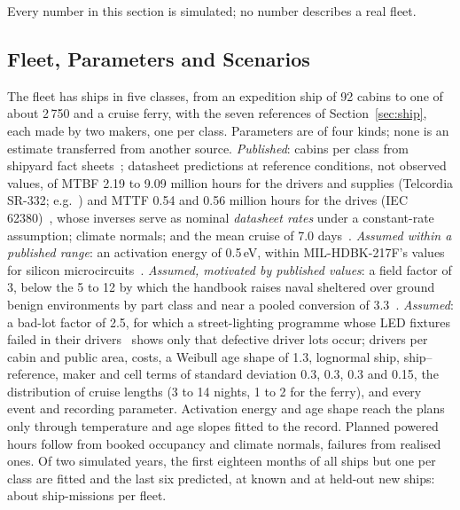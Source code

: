 Every number in this section is simulated; no number describes a real fleet.

\subsection{Fleet, Parameters and Scenarios}
The fleet has \flShips{} ships in five classes, from an expedition ship of 92
cabins to one of about 2\,750 and a cruise ferry, with the seven references of
Section~\ref{sec:ship}, each made by two makers, one per class. Parameters are
of four kinds; none is an estimate transferred from another source.
\emph{Published}: cabins per class from shipyard fact
sheets~\cite{fincantieri_laperouse,oasis_class}; datasheet predictions at
reference conditions, not observed values, of MTBF 2.19 to 9.09 million hours
for the drivers and supplies (Telcordia SR-332; e.g.~\cite{meanwell_lpv60}) and MTTF
0.54 and 0.56 million hours for the drives (IEC 62380)~\cite{schneider_atv212},
whose inverses serve as nominal \emph{datasheet rates} under a constant-rate
assumption; climate normals; and the mean cruise of 7.0
days~\cite{clia2025}. \emph{Assumed within a published range}: an activation
energy of 0.5\,eV, within MIL-HDBK-217F's values for silicon
microcircuits~\cite{milhdbk217f}. \emph{Assumed, motivated by published
values}: a field factor of 3, below the 5 to 12 by which the handbook raises
naval sheltered over ground benign environments by part class and near a pooled
conversion of 3.3~\cite{jeong2011}. \emph{Assumed}: a bad-lot factor
of 2.5, for which a street-lighting programme whose LED fixtures failed in
their drivers~\cite{halifax2019} shows only that defective driver lots occur;
drivers per cabin
and public area, costs, a Weibull age shape of 1.3, lognormal ship,
ship--reference, maker and cell terms of standard deviation 0.3, 0.3, 0.3 and
0.15, the distribution of cruise lengths (3 to 14 nights, 1 to 2 for the
ferry), and every event and recording parameter. Activation energy and age
shape reach the plans only through temperature and age slopes fitted to the
record. Planned powered hours follow from booked occupancy and climate
normals, failures from realised ones. Of two simulated years, the
first eighteen months of all ships but one per class are fitted and the last
six predicted, at known and at held-out new ships: about \fdMissions{}
ship-missions per fleet.

